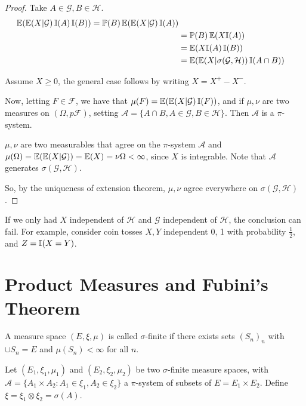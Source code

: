 \begin{proof}
  Take $A \in \mathcal{G}, B \in \mathcal{H}$.
  \begin{align*}
    \E{\E{X | \mathcal{G}} \I{A} \I{B}} = \Prob{B} \E{\E{X |
        \mathcal{G}} \I{A}} \\
    &= \Prob{B} \E{X \I{A}} \\
    &= \E{X \I{A} \I{B}} \\
    &= \E{\E{X | \sigma(\mathcal{G}, \mathcal{H})} \I{A \cap B}}
  \end{align*}
  
  Assume $X \geq 0$, the general case follows by writing $X = X^{+} -
  X^{-}$.

  Now, letting $F \in \mathcal{F}$, we have that $\mu(F) = \E{\E{X |
      \mathcal{G}} \I{F}}$, and if $\mu, \nu$ are two measures on $(\Omega,p
  \mathcal{F})$, setting $\mathcal{A} = \{ A \cap B, A \in
  \mathcal{G}, B \in \mathcal{H} \}$.  Then $\mathcal{A}$ is a
$\pi$-system.

  $\mu, \nu$ are two measurables that agree on the $\pi$-system
  $\mathcal{A}$ and $\mu(\Omega) = \E{\E{X|\mathcal{G}}} = \E{X} =
  \nu{\Omega} < \infty$, since $X$ is integrable.  Note that
  $\mathcal{A}$ generates $\sigma(\mathcal{G}, \mathcal{H})$.

  So, by the uniqueness of extension theorem, $\mu, \nu$ agree
  everywhere on $\sigma(\mathcal{G}, \mathcal{H})$.
\end{proof} 

\begin{remark}
  If we only had $X$ independent of $\mathcal{H}$ and $\mathcal{G}$
  independent of $\mathcal{H}$, the conclusion can fail.  For example,
  consider coin tosses $X, Y$ independent 0, 1 with probability
  $\frac{1}{2}$, and $Z = \I{X = Y}$.
\end{remark}


\section{Product Measures and Fubini's Theorem}
\label{sec:prod-meas-fubin}

\begin{defn}
  \label{defn:inequalities:3}
  A measure space $(E, \xi, \mu)$ is called $\sigma$-finite if there
  exists sets $(S_{n})_{n}$ with $\cup S_{n} = E$ and $\mu(S_{n}) <
  \infty$ for all $n$.
\end{defn}

Let $(E_{1}, \xi_{1}, \mu_{1})$ and $(E_{2}, \xi_{2}, \mu_{2})$ be two
$\sigma$-finite measure spaces, with $\mathcal{A} = \{ A_{1} \times
A_{2} : A_{1} \in \xi_{1}, A_{2} \in \xi_{2} \}$ a $\pi$-system of
subsets of $E = E_{1} \times E_{2}$.  Define $\xi = \xi_{1} \otimes
\xi_{2} = \sigma(A)$.


